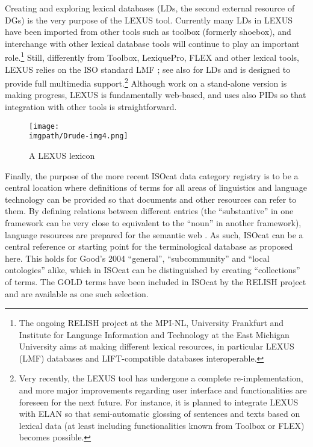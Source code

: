 Creating and exploring lexical databases (LDs, the second external resource of DGs) is the very purpose of the LEXUS tool. Currently many LDs in LEXUS have been imported from other tools such as toolbox (formerly shoebox), and interchange with other lexical database tools will continue to play an important role.\footnote{The 
 ongoing RELISH project at the MPI-NL, University Frankfurt and Institute for Language Information and Technology at the East Michigan University aims at making different lexical resources, in particular LEXUS (LMF) databases and LIFT-compatible databases interoperable.
}
Still, differently from Toolbox, LexiquePro, FLEX and other lexical tools, LEXUS relies on the ISO standard LMF \citep{FrancopouloEtAl2007}; see also \citet{RingersmaEtAl2010} for LDs and is designed to provide full multimedia support.\footnote{Very 
 recently, the LEXUS tool has undergone a complete re-implementation, and more major improvements regarding user interface and functionalities are foreseen for the next future. For instance, it is planned to integrate LEXUS with ELAN so that semi-automatic glossing of sentences and texts based on lexical data (at least including functionalities known from Toolbox or FLEX) becomes possible.
} 
Although work on a stand-alone version is making progress, LEXUS is fundamentally web-based, and uses also PIDs so that integration with other tools is straightforward. 


\begin{figure}
\texttt{[image: \\imgpath/Drude-img4.png]}
\caption{A LEXUS lexicon}
\end{figure}
 
Finally, the purpose of the more recent ISOcat data category registry is to be a central location where definitions of terms for all areas of linguistics and language technology can be provided so that documents and other resources can refer to them. By defining relations between different entries (the ``substantive'' in one framework can be very close to equivalent to the ``noun'' in another framework), language resources are prepared for the semantic web \citep{W3C2011,GoodEtAl2010}. As such, ISOcat can be a central reference or starting point for the terminological database as proposed here. This holds for Good's 2004 ``general'', ``subcommunity'' and ``local ontologies'' alike, which in ISOcat can be distinguished by creating ``collections'' of terms. The GOLD \citep{FarrarEtAl2003} terms have been included in ISOcat by the RELISH  project and are available as one such selection.

